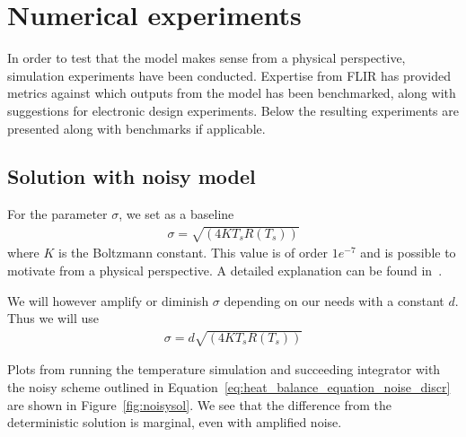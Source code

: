 \section{Numerical experiments}

In order to test that the model makes sense from a physical
perspective, simulation experiments have been conducted. Expertise
from FLIR has provided metrics against which outputs from the model
has been benchmarked, along with suggestions for electronic design
experiments. Below the resulting experiments are presented along with
benchmarks if applicable.


\subsection{Solution with noisy model}
For the parameter $\sigma$, we set as a baseline
\begin{align}
\sigma = \sqrt{(4KT_sR(T_s))}
\end{align}
where  $K$ is the Boltzmann constant. This value is of order $1e^{-7}$
and is possible to motivate from a physical perspective. A detailed
explanation can be found in~\cite{WOOD199743}.

We will however amplify or diminish $\sigma$ depending on our needs
with a constant $d$. Thus we will use
\begin{align}
\sigma = d \sqrt{(4KT_sR(T_s))}
\end{align}

Plots from running the temperature simulation and succeeding
integrator with the noisy scheme outlined in
Equation~\eqref{eq:heat_balance_equation_noise_discr} are shown
in Figure~\ref{fig:noisysol}. We see that the difference from the
deterministic solution is marginal, even with amplified noise.

